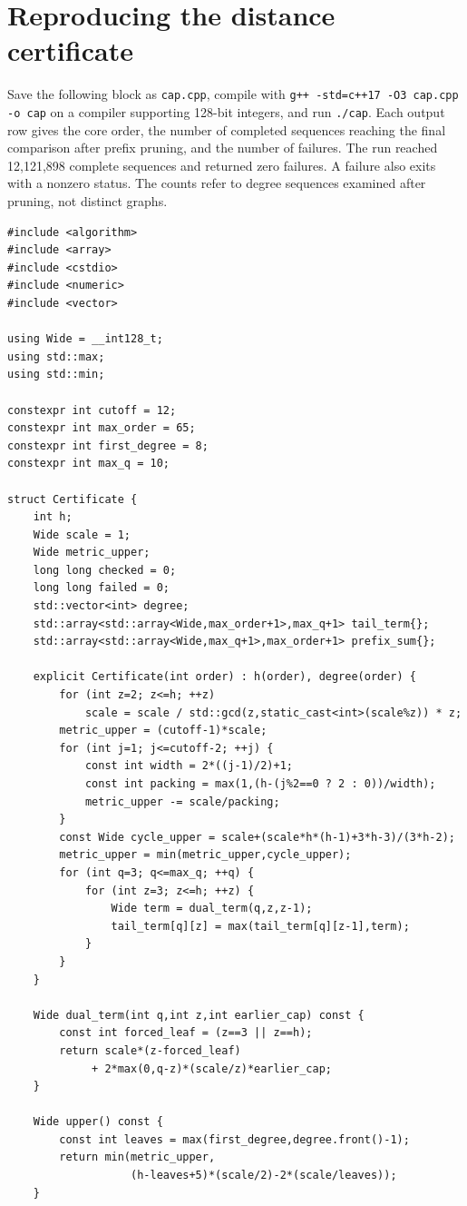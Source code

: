 \documentclass[11pt,a4paper]{article}
\begin{document}
\section{Reproducing the distance certificate}
Save the following block as \texttt{cap.cpp}, compile with \texttt{g++ -std=c++17 -O3 cap.cpp -o cap} on a compiler supporting 128-bit integers, and run \texttt{./cap}. Each output row gives the core order, the number of completed sequences reaching the final comparison after prefix pruning, and the number of failures. The run reached 12,121,898 complete sequences and returned zero failures. A failure also exits with a nonzero status. The counts refer to degree sequences examined after pruning, not distinct graphs.
\begin{Verbatim}[fontsize=\scriptsize]
#include <algorithm>
#include <array>
#include <cstdio>
#include <numeric>
#include <vector>

using Wide = __int128_t;
using std::max;
using std::min;

constexpr int cutoff = 12;
constexpr int max_order = 65;
constexpr int first_degree = 8;
constexpr int max_q = 10;

struct Certificate {
    int h;
    Wide scale = 1;
    Wide metric_upper;
    long long checked = 0;
    long long failed = 0;
    std::vector<int> degree;
    std::array<std::array<Wide,max_order+1>,max_q+1> tail_term{};
    std::array<std::array<Wide,max_q+1>,max_order+1> prefix_sum{};

    explicit Certificate(int order) : h(order), degree(order) {
        for (int z=2; z<=h; ++z)
            scale = scale / std::gcd(z,static_cast<int>(scale%z)) * z;
        metric_upper = (cutoff-1)*scale;
        for (int j=1; j<=cutoff-2; ++j) {
            const int width = 2*((j-1)/2)+1;
            const int packing = max(1,(h-(j%2==0 ? 2 : 0))/width);
            metric_upper -= scale/packing;
        }
        const Wide cycle_upper = scale+(scale*h*(h-1)+3*h-3)/(3*h-2);
        metric_upper = min(metric_upper,cycle_upper);
        for (int q=3; q<=max_q; ++q) {
            for (int z=3; z<=h; ++z) {
                Wide term = dual_term(q,z,z-1);
                tail_term[q][z] = max(tail_term[q][z-1],term);
            }
        }
    }

    Wide dual_term(int q,int z,int earlier_cap) const {
        const int forced_leaf = (z==3 || z==h);
        return scale*(z-forced_leaf)
             + 2*max(0,q-z)*(scale/z)*earlier_cap;
    }

    Wide upper() const {
        const int leaves = max(first_degree,degree.front()-1);
        return min(metric_upper,
                   (h-leaves+5)*(scale/2)-2*(scale/leaves));
    }


\end{Verbatim}
\end{document}
